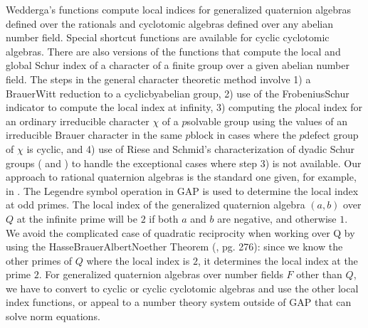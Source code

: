 \documentclass[a4paper,11pt]{report}
\begin{document}
{{ Wedderga's functions compute local indices for generalized quaternion algebras
defined over the rationals and cyclotomic algebras defined over any abelian
number field. Special shortcut functions are available for cyclic cyclotomic
algebras. There are also versions of the functions that compute the local and
global Schur index of a character of a finite group over a given abelian
number field. The steps in the general character\texttt{} theoretic
method involve 1) a Brauer\texttt{}Witt reduction to a
cyclic\texttt{}by\texttt{}abelian group, 2) use of the
Frobenius\texttt{}Schur indicator to compute the local index at
infinity, 3) computing the $p$\texttt{}local index for an ordinary irreducible character $\chi$ of a $p$\texttt{}solvable group using the values of an irreducible Brauer
character in the same $p$\texttt{}block in cases where the $p$\texttt{}defect group of $\chi$ is cyclic, and 4) use of Riese and Schmid's characterization of dyadic Schur
groups (\cite{Sch} and \cite{RSch}) to handle the exceptional cases where step 3) is not available. Our approach
to rational quaternion algebras is the standard one given, for example, in \cite{Pi}. The Legendre symbol operation in GAP is used to determine the local index at
odd primes. The local index of the generalized quaternion algebra $(a,b)$ over $Q$ at the infinite prime will be $2$ if both $a$ and $b$ are negative, and otherwise $1$. We avoid the complicated case of quadratic reciprocity when working over Q
by using the
Hasse\texttt{}Brauer\texttt{}Albert\texttt{}Noether
Theorem (\cite{R}, pg. 276): since we know the other primes of $Q$ where the local index is $2$, it determines the local index at the prime $2$. For generalized quaternion algebras over number fields $F$ other than $Q$, we have to convert to cyclic or cyclic cyclotomic algebras and use the other
local index functions, or appeal to a number theory system outside of GAP that
can solve norm equations. 

}}
\end{document}
